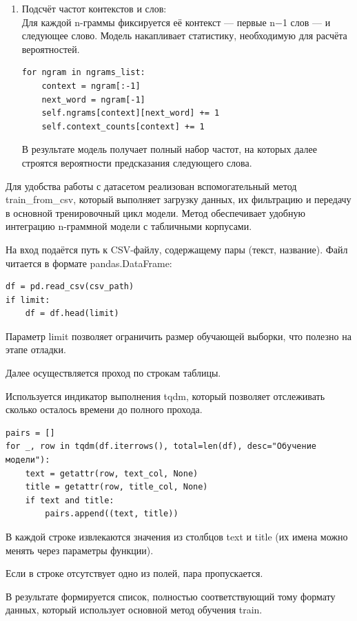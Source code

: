 \documentclass[coursework]{SCWorks}
\begin{document}
\begin{enumerate}
        \item Подсчёт частот контекстов и слов: \\
        Для каждой n-граммы фиксируется её контекст — первые n−1 слов — и следующее слово.
        Модель накапливает статистику, необходимую для расчёта вероятностей.
        \begin{verbatim}
for ngram in ngrams_list:
    context = ngram[:-1]
    next_word = ngram[-1]
    self.ngrams[context][next_word] += 1
    self.context_counts[context] += 1
        \end{verbatim}
        В результате модель получает полный набор частот, на которых далее строятся вероятности предсказания следующего слова.
    \end{enumerate}

    Для удобства работы с датасетом реализован вспомогательный метод train\_from\_csv, который выполняет загрузку данных,
    их фильтрацию и передачу в основной тренировочный цикл модели.
    Метод обеспечивает удобную интеграцию n-граммной модели с табличными корпусами.

    На вход подаётся путь к CSV-файлу, содержащему пары {(текст, название)}.
    Файл читается в формате pandas.DataFrame:
    \begin{verbatim}
df = pd.read_csv(csv_path)
if limit:
    df = df.head(limit)
    \end{verbatim}

    Параметр limit позволяет ограничить размер обучающей выборки, что полезно на этапе отладки.

    Далее осуществляется проход по строкам таблицы.

    Используется индикатор выполнения tqdm, который позволяет отслеживать сколько осталось времени до полного прохода.

    \begin{verbatim}
pairs = []
for _, row in tqdm(df.iterrows(), total=len(df), desc="Обучение модели"):
    text = getattr(row, text_col, None)
    title = getattr(row, title_col, None)
    if text and title:
        pairs.append((text, title))
    \end{verbatim}

    В каждой строке извлекаются значения из столбцов text и title (их имена можно менять через параметры функции).

    Если в строке отсутствует одно из полей, пара пропускается.

    В результате формируется список, полностью соответствующий тому формату данных, который использует основной метод обучения train.
\end{document}
